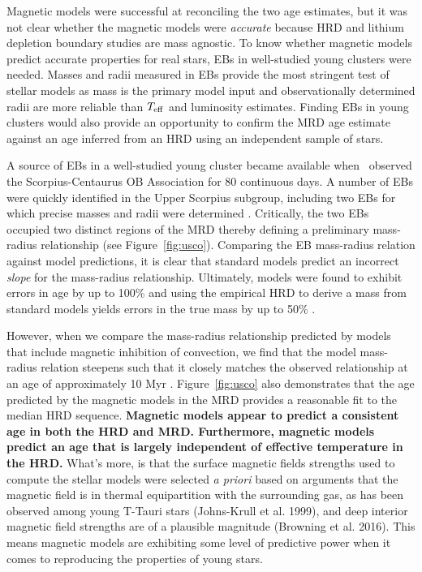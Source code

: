 Magnetic models were successful at reconciling the two age estimates, but it was not clear whether the magnetic models were {\it accurate} because HRD and lithium depletion boundary studies are mass agnostic. To know whether magnetic models predict accurate properties for real stars, EBs in well-studied young clusters were needed. Masses and radii measured in EBs provide the most stringent test of stellar models as mass is the primary model input and observationally determined radii are more reliable than $T_{\rm eff}$ and luminosity estimates. Finding EBs in young clusters would also provide an opportunity to confirm the MRD age estimate against an age inferred from an HRD using an independent sample of stars.

A source of EBs in a well-studied young cluster became available when \kepler\ observed the Scorpius-Centaurus OB Association for 80 continuous days. A number of EBs were quickly identified in the Upper Scorpius subgroup, including two EBs for which precise masses and radii were determined \citep{Kraus2015, Alonso2015}. Critically, the two EBs occupied two distinct regions of the MRD thereby defining a preliminary mass-radius relationship (see Figure~\ref{fig:usco}). Comparing the EB mass-radius relation against model predictions, it is clear that standard models predict an incorrect {\it slope} for the mass-radius relationship. Ultimately, models were found to exhibit errors in age by up to 100\% and using the empirical HRD to derive a mass from standard models yields errors in the true mass by up to 50\% \citep{Kraus2015}.

However, when we compare the mass-radius relationship predicted by models that include magnetic inhibition of convection, we find that the model mass-radius relation steepens such that it closely matches the observed relationship at an age of approximately 10 Myr \citep[see Figure~\ref{fig:usco};][]{Feiden2016}. Figure~\ref{fig:usco} also demonstrates that the age predicted by the magnetic models in the MRD provides a reasonable fit to the median HRD sequence. {\bf Magnetic models appear to predict a consistent age in both the HRD and MRD. Furthermore, magnetic models predict an age that is largely independent of effective temperature in the HRD.} What's more, is that the surface magnetic fields strengths used to compute the stellar models were selected {\it a priori} based on arguments that the magnetic field is in thermal equipartition with the surrounding gas, as has been observed among young T-Tauri stars (Johns-Krull et al. 1999), and deep interior magnetic field strengths are of a plausible magnitude (Browning et al. 2016). This means magnetic models are exhibiting some level of predictive power when it comes to reproducing the properties of young stars.

